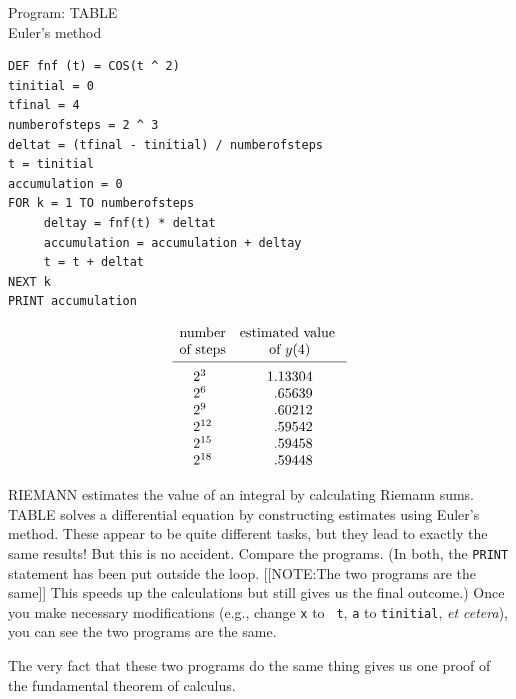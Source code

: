\begin{center}
Program: TABLE\\
Euler's method
\end{center}


\begin{verbatim}
DEF fnf (t) = COS(t ^ 2)
tinitial = 0
tfinal = 4
numberofsteps = 2 ^ 3
deltat = (tfinal - tinitial) / numberofsteps
t = tinitial
accumulation = 0
FOR k = 1 TO numberofsteps
     deltay = fnf(t) * deltat
     accumulation = accumulation + deltay
     t = t + deltat
NEXT k
PRINT accumulation 
\end{verbatim}
	\[
\begin{array}{cc}
	\mbox{number} & \mbox{estimated value } \\
	\mbox{of steps} & \mbox{of $y(4)$}  	\\ [2pt]
	\hline \\ [-7pt]
	\begin{array}{l} 
		2^3 \\ 2^6 \\ 2^9 \\ 2^{12} \\ 2^{15} \\ 2^{18}
	\end{array}
	&
	\begin{array}{r}
		1.13304 \\ .65639 \\ .60212 \\ .59542 \\ .59458 \\
			.59448
	\end{array}
\end{array}
\]
\normalsize

RIEMANN estimates the value of an integral by calculating Riemann
sums.  TABLE solves a differential equation by constructing estimates
using Euler's method.  These appear to be quite different tasks, but
they lead to exactly the same results!  But this is no accident.
Compare the programs.  (In both, the {\tt PRINT} statement has been
put outside the loop.
[[NOTE:The two programs  are the same]]
This speeds up the calculations but still gives us the final outcome.)
Once you make necessary modifications (e.g., change {\tt x} to {\tt
  t}, {\tt a} to {\tt tinitial}, {\em et cetera\/}), you can see the
two programs are the same.

The very fact that these two programs do the same thing gives us one
proof of the fundamental theorem of calculus.

